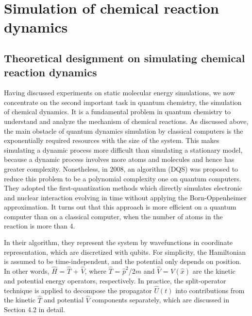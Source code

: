 \documentclass[8.5pt,twoside,twocolumn]{article}
\begin{document}
\section{Simulation of chemical reaction dynamics}

\subsection{Theoretical designment on simulating chemical reaction dynamics}

Having discussed experiments on
static molecular energy simulations,
we now concentrate on the second important task in quantum chemistry,
the simulation of chemical dynamics.
It is a fundamental problem in quantum chemistry
to understand and analyze the mechanism of chemical reactions.
As discussed above, the main obstacle of quantum dynamics simulation
by classical computers is the exponentially required resources
with the size of the system.\cite{Open_Dynamics} This makes simulating a dynamic process
more difficult than simulating a stationary model,
because a dynamic process involves more atoms and molecules
and hence has greater complexity.
Nonetheless, in 2008, an algorithm (DQS) was proposed to reduce this problem
to be a polynomial complexity one on quantum computers.\cite{Polynomial_time_algorithm}
They adopted the first-quantization methods
which directly simulates electronic and nuclear interaction
evolving in time without applying
the Born-Oppenheimer approximation.
It turns out that this approach is more efficient
on a quantum computer than on a classical computer,
when the number of atoms in the reaction is more than 4.

In their algorithm, they represent the system by
wavefunctions in coordinate representation,
which are discretized with qubits.
For simplicity, the Hamiltonian is assumed to be time-independent,
and the potential only depends on position.
In other words, $\hat{H}$ = $\hat{T}$ + $\hat{V}$,
where $\hat{T}$ = $\hat{p}^{2}$/2$m$ and $\hat{V}$ = $V(\hat{x})$
are the kinetic and potential energy operators, respectively.
In practice, the split-operator technique\cite{first_quantization_2,Trotter_1,Trotter_2}
is applied to decompose the propagator $\hat{U}(t)$
into contributions from the kinetic $\hat{T}$ and potential $\hat{V}$
components separately, which are discussed in Section 4.2 in detail.
\end{document}
